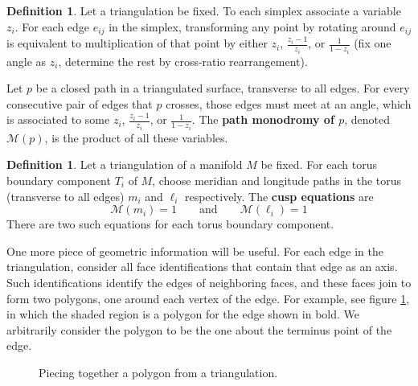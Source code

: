\documentclass[10pt]{amsart}
\numberwithin{equation}{theorem}
\theoremstyle{definition}
\newtheorem{definition}[theorem]{Definition}
\newcommand{\definedterm}[1]{\textbf{#1}}
\begin{document}
\begin{definition}
  Let a triangulation be fixed. To each simplex associate a variable
  $z_i$. For each edge $e_{ij}$ in the simplex, transforming any point
  by rotating around $e_{ij}$ is equivalent to multiplication of that
  point by either $z_i$, $\frac{z_i - 1}{z_i}$, or $\frac{1}{1-z_i}$
  (fix one angle as $z_i$, determine the rest by cross-ratio
  rearrangement).

  Let $p$ be a closed path in a triangulated surface, transverse to
  all edges. For every consecutive pair of edges that $p$ crosses,
  those edges must meet at an angle, which is associated to some
  $z_i$, $\frac{z_i - 1}{z_i}$, or $\frac{1}{1-z_i}$. The
  \definedterm{path monodromy of $p$}, denoted $\mathcal{M}(p)$, is
  the product of all these variables.
\end{definition}

\begin{definition}
  Let a triangulation of a manifold $M$ be fixed. For each torus
  boundary component $T_i$ of $M$, choose meridian and longitude paths
  in the torus (transverse to all edges) $m_i$ and $\ell_i$
  respectively. The \definedterm{cusp equations} are
  \begin{equation}
    \label{eq:cusp}
    \mathcal{M}(m_i) = 1 \qquad\text{and}\qquad \mathcal{M}(\ell_i) = 1
  \end{equation}
  There are two such equations for each torus boundary component.
\end{definition}

One more piece of geometric information will be useful. For each edge
in the triangulation, consider all face identifications that contain
that edge as an axis. Such identifications identify the edges of
neighboring faces, and these faces join to form two polygons, one
around each vertex of the edge. For example, see figure
\ref{fig:sort_of_lens_space_looking_thing}, in which the shaded region
is a polygon for the edge shown in bold.  We arbitrarily consider the
polygon to be the one about the terminus point of the edge.

\begin{figure}[h]
  \caption{Piecing together a polygon from a triangulation.}
  \label{fig:sort_of_lens_space_looking_thing}
\end{figure}
\end{document}
